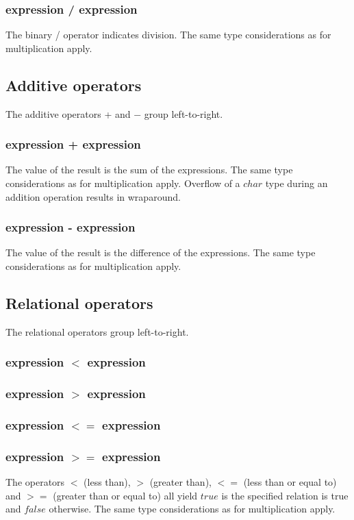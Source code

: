 \begin{homeworkProblem}
    \subsubsection{expression / expression}
    The binary / operator indicates division. The same type considerations as for multiplication apply.

    \subsection{Additive operators}
    The additive operators + and − group left-to-right.

    \subsubsection{expression + expression}
    The value of the result is the sum of the expressions. The same type considerations as for multiplication apply. Overflow of a $char$ type during an addition operation results in wraparound.

    \subsubsection{expression - expression}
    The value of the result is the difference of the expressions. The same type considerations as for multiplication apply.

    \subsection{Relational operators}
    The relational operators group left-to-right.
    
    \subsubsection{expression $<$ expression}
    \subsubsection{expression $>$ expression}
    \subsubsection{expression $<=$ expression}
    \subsubsection{expression $>=$ expression}
    The operators $<$ (less than), $>$ (greater than), $<=$ (less than or equal to) and $>=$ (greater than or equal to) all yield $true$ is the specified relation is true and $false$ otherwise. The same type considerations as for multiplication apply.


\end{homeworkProblem}
